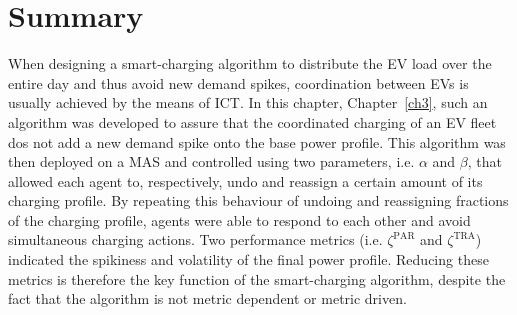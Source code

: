 \section{Summary}
\label{ch3:sec:summary}

When designing a smart-charging algorithm to distribute the EV load over the entire day and thus avoid new demand spikes, coordination between EVs is usually achieved by the means of ICT.
In this chapter, Chapter~\ref{ch3}, such an algorithm was developed to assure that the coordinated charging of an EV fleet dos not add a new demand spike onto the base power profile.
This algorithm was then deployed on a MAS and controlled using two parameters, i.e. $\alpha$ and $\beta$, that allowed each agent to, respectively, undo and reassign a certain amount of its charging profile.
By repeating this behaviour of undoing and reassigning fractions of the charging profile, agents were able to respond to each other and avoid simultaneous charging actions.
Two performance metrics (i.e. $\zeta^\text{PAR}$ and $\zeta^\text{TRA}$) indicated the spikiness and volatility of the final power profile.
Reducing these metrics is therefore the key function of the smart-charging algorithm, despite the fact that the algorithm is not metric dependent or metric driven.

